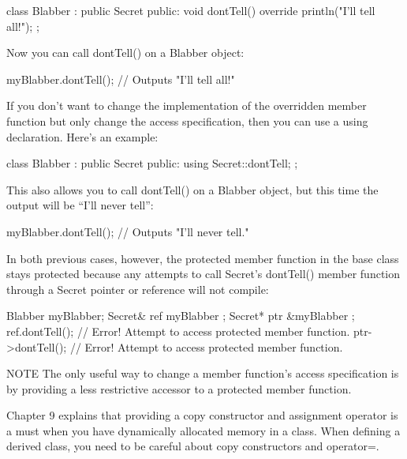 \begin{cpp}
class Blabber : public Secret
{
    public:
        void dontTell() override { println("I'll tell all!"); }
};
\end{cpp}

Now you can call dontTell() on a Blabber object:

\begin{cpp}
myBlabber.dontTell(); // Outputs "I'll tell all!"
\end{cpp}

If you don’t want to change the implementation of the overridden member function but only change the access specification, then you can use a using declaration. Here’s an example:

\begin{cpp}
class Blabber : public Secret
{
    public:
        using Secret::dontTell;
};
\end{cpp}

This also allows you to call dontTell() on a Blabber object, but this time the output will be “I’ll never tell”:

\begin{cpp}
myBlabber.dontTell(); // Outputs "I'll never tell."
\end{cpp}

In both previous cases, however, the protected member function in the base class stays protected because any attempts to call Secret’s dontTell() member function through a Secret pointer or reference will not compile:

\begin{cpp}
Blabber myBlabber;
Secret& ref { myBlabber };
Secret* ptr { &myBlabber };
ref.dontTell(); // Error! Attempt to access protected member function.
ptr->dontTell(); // Error! Attempt to access protected member function.
\end{cpp}

\begin{myNotic}{NOTE}
The only useful way to change a member function’s access specification is by providing a less restrictive accessor to a protected member function.
\end{myNotic}


Chapter 9 explains that providing a copy constructor and assignment operator is a must when you have dynamically allocated memory in a class. When defining a derived class, you need to be careful about copy constructors and operator=.

